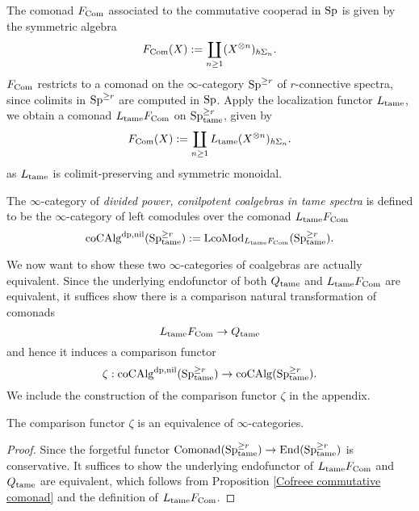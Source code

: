The comonad $F_{\Com}$ associated to the commutative cooperad in $\Sp$ is given by the symmetric algebra
$$
F_{\Com}(X) := \coprod_{n\geq 1} (X^{\otimes n})_{h\Sigma_n}.
$$
$F_{\Com}$ restricts to a comonad on the $\infty$-category $\Sp^{\geq r}$ of $r$-connective spectra, since colimits in $\Sp^{\geq r}$ are computed in $\Sp$.
Apply the localization functor $L_{\tame}$, we obtain a comonad $L_{\tame}F_{\Com}$ on $\Sp_{\tame}^{\geq r}$, given by 
$$
F_{\Com}(X) := \coprod_{n\geq 1} L_{\tame}(X^{\otimes n})_{h\Sigma_n}.
$$
as $L_{\tame}$ is colimit-preserving and symmetric monoidal.
\begin{definition}
    The $\infty$-category of \emph{divided power, conilpotent coalgebras in tame spectra} is defined to be the $\infty$-category of left comodules over the comonad $L_{\tame}F_{\Com}$
    \[
    \coCAlg^{\divpow, \nil}(\Sp_{\tame}^{\geq r}):= \operatorname{LcoMod}_{L_{\tame}F_{\Com}}(\Sp_{\tame}^{\geq r}).
    \]
\end{definition}
We now want to show these two $\infty$-categories of coalgebras are actually equivalent. 
Since the underlying endofunctor of both $Q_{\tame}$ and $L_{\tame}F_{\Com}$ are equivalent, it suffices show there is a comparison natural transformation of comonads
$$
L_{\tame}F_{\Com}\to 
Q_{\tame}
$$
and hence it induces a comparison functor
$$
\zeta:\coCAlg^{\divpow,\nil}(\Sp^{\geq r}_{\tame}) \to
\coCAlg(\Sp^{\geq r}_{\tame}).
$$
We include the construction of the comparison functor $\zeta$ in the appendix.

\begin{proposition}
\label{all coalgebras are equivalent}
	The comparison functor $\zeta$ is an equivalence of $\infty$-categories.
\end{proposition}
\begin{proof}
Since the forgetful functor $\Comonad(\Sp^{\geq r}_{\tame}) \to \End(\Sp^{\geq r}_{\tame})$ is conservative.
It suffices to show the underlying endofunctor of $L_{\tame}F_{\Com}$ and $Q_{\tame}$ are equivalent, which follows from Proposition \ref{Cofreee commutative comonad} and the definition of $L_{\tame}F_{\Com}$.
\end{proof}



